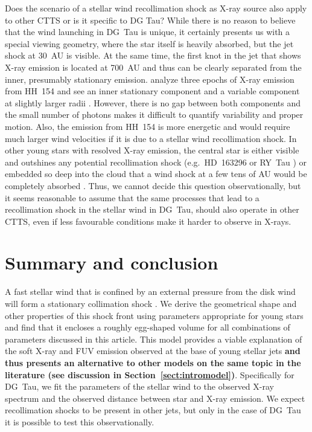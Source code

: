 \documentclass[manuscript]{aastex}
\begin{document}
Does the scenario of a stellar wind recollimation shock as X-ray source also apply to other CTTS or is it specific to DG Tau? While there is no reason to believe that the wind launching in DG~Tau is unique, it certainly presents us with a special viewing geometry, where the star itself is heavily absorbed, but the jet shock at 30~AU is visible. At the same time, the first knot in the jet that shows X-ray emission is located at 700~AU and thus can be clearly separated from the inner, presumably stationary emission. \citet{2011A&A...530A.123S} analyze three epochs of X-ray emission from HH~154 and see an inner stationary component and a variable component at slightly larger radii \textbf{\citep[see also][]{2011ApJ...737...54B}}. However, there is no gap between both components and the small number of photons makes it difficult to quantify variability and proper motion. Also, the emission from HH~154 is more energetic and would require much larger wind velocities if it is due to a stellar wind recollimation shock. In other young stars with resolved X-ray emission, the central star is either visible and outshines any potential recollimation shock (e.g.\ HD~163296 \citep{2005ApJ...628..811S,2013A&A...552A.142G} or RY~Tau \citep{2014ApJ...788..101S}) or embedded so deep into the cloud that a wind shock at a few tens of AU would be completely absorbed \citep[e.g.\ HH80/81][]{2004ApJ...605..259P}. Thus, we cannot decide this question observationally, but it seems reasonable to assume that the same processes that lead to a recollimation shock in the stellar wind in DG~Tau, should also operate in other CTTS, even if less favourable conditions make it harder to observe in X-rays.



\section{Summary and conclusion}
\label{sect:summary}
A fast stellar wind that is confined by an external pressure from the disk wind will form a stationary collimation shock \citep{2012MNRAS.422.2282K}. We derive the geometrical shape and other properties of this shock front using parameters appropriate for young stars and find that it encloses a roughly egg-shaped volume for all combinations of parameters discussed in this article. This model provides a viable explanation of the soft X-ray and FUV emission observed at the base of young stellar jets \textbf{and thus presents an alternative to other models on the same topic in the literature (see discussion in Section~\ref{sect:intromodel})}. Specifically for DG~Tau, we fit the parameters of the stellar wind to the observed X-ray spectrum and the observed distance between star and X-ray emission.  We expect recollimation shocks to be present in other jets, but only in the case of DG~Tau it is possible to test this observationally.
\end{document}

